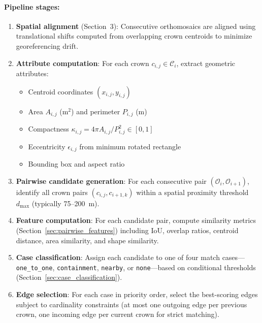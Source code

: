 \paragraph{Pipeline stages:}
\begin{enumerate}[leftmargin=*, itemsep=2pt]
    \item \textbf{Spatial alignment} (Section~3): Consecutive orthomosaics are aligned using translational shifts computed from overlapping crown centroids to minimize georeferencing drift.
    
    \item \textbf{Attribute computation}: For each crown $c_{i,j} \in \mathcal{C}_i$, extract geometric attributes:
    \begin{itemize}
        \item Centroid coordinates $(x_{i,j}, y_{i,j})$
        \item Area $A_{i,j}$ (m$^2$) and perimeter $P_{i,j}$ (m)
        \item Compactness $\kappa_{i,j} = 4\pi A_{i,j} / P_{i,j}^2 \in [0,1]$
        \item Eccentricity $\epsilon_{i,j}$ from minimum rotated rectangle
        \item Bounding box and aspect ratio
    \end{itemize}
    
    \item \textbf{Pairwise candidate generation}: For each consecutive pair $(\mathcal{O}_i, \mathcal{O}_{i+1})$, identify all crown pairs $(c_{i,j}, c_{i+1,k})$ within a spatial proximity threshold $d_{\text{max}}$ (typically 75--200~m).
    
    \item \textbf{Feature computation}: For each candidate pair, compute similarity metrics (Section~\ref{sec:pairwise_features}) including IoU, overlap ratios, centroid distance, area similarity, and shape similarity.
    
    \item \textbf{Case classification}: Assign each candidate to one of four match cases—\texttt{one\_to\_one}, \texttt{containment}, \texttt{nearby}, or \texttt{none}—based on conditional thresholds (Section~\ref{sec:case_classification}).
    
    \item \textbf{Edge selection}: For each case in priority order, select the best-scoring edges subject to cardinality constraints (at most one outgoing edge per previous crown, one incoming edge per current crown for strict matching).
    

\end{enumerate}
